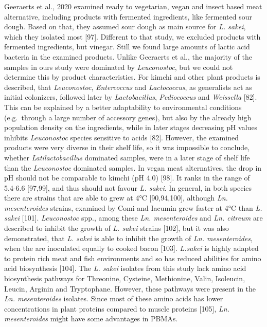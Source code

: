 \documentclass[preprint,3p,
a4paper]{elsarticle} %
\begin{document}
Geeraerts et al., 2020 examined ready to vegetarian, vegan and insect
based meat alternative, including products with fermented ingredients,
like fermented sour dough. Based on that, they assumed sour dough as
main source for \emph{L. sakei}, which they isolated most {[}97{]}.
Different to that study, we excluded products with fermented
ingredients, but vinegar. Still we found large amounts of lactic acid
bacteria in the examined products. Unlike Geeraerts et al., the majority
of the samples in ours study were dominated by \emph{Leuconostoc}, but
we could not determine this by product characteristics. For kimchi and
other plant products is described, that \emph{Leuconostoc},
\emph{Entercoccus} and \emph{Lactococcus}, as generalists act as initial
colonizers, followed later by \emph{Lactobacillus}, \emph{Pediococcus}
and \emph{Weissella} {[}82{]}. This can be explained by a better
adaptability to environmental conditions (e.g.~through a large number of
accessory genes), but also by the already high population density on the
ingredients, while in later stages decreasing pH values inhibits
\emph{Leuconostoc} species sensitive to acids {[}82{]}. However, the
examined products were very diverse in their shelf life, so it was
impossible to conclude, whether \emph{Latilactobacillus} dominated
samples, were in a later stage of shelf life than the \emph{Leuconostoc}
dominated samples. In vegan meat alternatives, the drop in pH should not
be comparable to kimchi (pH 4.0) {[}98{]}. It ranks in the range of
5.4-6.6 {[}97,99{]}, and thus should not favour \emph{L. sakei}. In
general, in both species there are strains that are able to grew at 4°C
{[}90,94,100{]}, although \emph{Ln. mesenteroides} strains, examined by
Comi and Iacumin grew faster at 4°C than \emph{L. sakei} {[}101{]}.
\emph{Leuconostoc} spp., among these \emph{Ln. mesenteroides} and
\emph{Ln. citreum} are described to inhibit the growth of \emph{L.
sakei} strains {[}102{]}, but it was also demonstrated, that \emph{L.
sakei} is able to inhibit the growth of \emph{Ln. mesenteroides}, when
the are inoculated equally to cooked bacon {[}103{]}. \emph{L.sakei} is
highly adapted to protein rich meat and fish environments and so has
reduced abilities for amino acid biosynthesis {[}104{]}. The \emph{L.
sakei} isolates from this study lack amino acid biosynthesis pathways
for Threonine, Cysteine, Methionine, Valin, Isoleucin, Leucin, Arginin
and Tryptophane. However, these pathways were present in the \emph{Ln.
mesenteroides} isolates. Since most of these amino acids has lower
concentrations in plant proteins compared to muscle proteins {[}105{]},
\emph{Ln. mesenteroides} might have some advantages in PBMAs.
\end{document}
